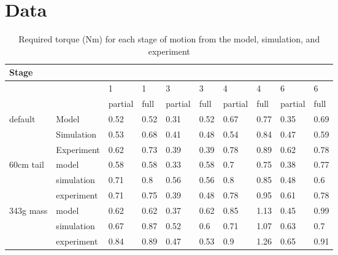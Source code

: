 \chapter{Data} \label{app:data}


\begin{table}[!ht]
	\centering
	\caption{Required torque (Nm) for each stage of motion from the model, simulation, and experiment}
	\footnotesize
	\begin{tabular}{|l|l|l|l|l|l|l|l|l|l|}
		\hline
		Stage & ~ & ~ & ~ & ~ & ~ & ~ & ~ & ~ & ~ \\ \hline
		~ & ~ & 1 & 1 & 3 & 3 & 4 & 4 & 6 & 6 \\ \hline
		~ & ~ & partial & full & partial & full & partial & full & partial & full \\ \hline
		default & Model & 0.52 & 0.52 & 0.31 & 0.52 & 0.67 & 0.77 & 0.35 & 0.69 \\ \hline
		~ & Simulation & 0.53 & 0.68 & 0.41 & 0.48 & 0.54 & 0.84 & 0.47 & 0.59 \\ \hline
		~ & Experiment & 0.62 & 0.73 & 0.39 & 0.39 & 0.78 & 0.89 & 0.62 & 0.78 \\ \hline
		60cm tail & model & 0.58 & 0.58 & 0.33 & 0.58 & 0.7 & 0.75 & 0.38 & 0.77 \\ \hline
		~ & simulation & 0.71 & 0.8 & 0.56 & 0.56 & 0.8 & 0.85 & 0.48 & 0.6 \\ \hline
		~ & experiment & 0.71 & 0.75 & 0.39 & 0.48 & 0.78 & 0.95 & 0.61 & 0.78 \\ \hline
		343g mass & model & 0.62 & 0.62 & 0.37 & 0.62 & 0.85 & 1.13 & 0.45 & 0.99 \\ \hline
		~ & simulation & 0.67 & 0.87 & 0.52 & 0.6 & 0.71 & 1.07 & 0.63 & 0.7 \\ \hline
		~ & experiment & 0.84 & 0.89 & 0.47 & 0.53 & 0.9 & 1.26 & 0.65 & 0.91 \\ \hline
	\end{tabular}
\end{table}
